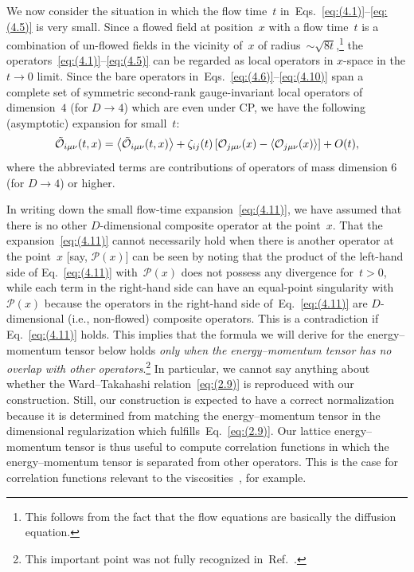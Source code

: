 We now consider the situation in which the flow time~$t$
in~Eqs.~\eqref{eq:(4.1)}--\eqref{eq:(4.5)} is very small. Since a flowed field
at position~$x$ with a flow time~$t$ is a combination of un-flowed fields in
the vicinity of~$x$ of radius~$\sim\sqrt{8t}$,\footnote{This follows from
the fact that the flow equations are basically the diffusion equation.} the
operators~\eqref{eq:(4.1)}--\eqref{eq:(4.5)} can be regarded as local operators
in $x$-space in the $t\to0$ limit. Since the bare operators
in~Eqs.~\eqref{eq:(4.6)}--\eqref{eq:(4.10)} span a complete set of symmetric
second-rank gauge-invariant local operators of dimension~$4$ (for $D\to4$)
which are even under CP, we have the following (asymptotic) expansion for
small~$t$:
\begin{equation}
   \Tilde{\mathcal{O}}_{i\mu\nu}(t,x)
   =\left\langle\Tilde{\mathcal{O}}_{i\mu\nu}(t,x)\right\rangle
   +\zeta_{ij}(t)
   \left[\mathcal{O}_{j\mu\nu}(x)
   -\left\langle\mathcal{O}_{j\mu\nu}(x)\right\rangle\right]+O(t),
\label{eq:(4.11)}
\end{equation}
where the abbreviated terms are contributions of operators of mass dimension
$6$ (for $D\to4$) or higher.

In writing down the small flow-time expansion~\eqref{eq:(4.11)}, we have
assumed that there is no other $D$-dimensional composite operator at the
point~$x$. That the expansion~\eqref{eq:(4.11)} cannot necessarily hold when
there is another operator at the point~$x$ [say, $\mathcal{P}(x)$] can be seen
by noting that the product of the left-hand side of Eq.~\eqref{eq:(4.11)}
with~$\mathcal{P}(x)$ does not possess any divergence for~$t>0$, while each
term in the right-hand side can have an equal-point singularity
with~$\mathcal{P}(x)$ because the operators in the right-hand side
of~Eq.~\eqref{eq:(4.11)} are $D$-dimensional (i.e., non-flowed) composite
operators. This is a contradiction if Eq.~\eqref{eq:(4.11)} holds. This implies
that the formula we will derive for the energy--momentum tensor below holds
\emph{only when the energy--momentum tensor has no overlap with other
operators}.\footnote{This important point was not fully recognized
in~Ref.~\cite{Suzuki:2013gza}.} In particular, we cannot say anything about
whether the Ward--Takahashi relation~\eqref{eq:(2.9)} is reproduced with our
construction. Still, our construction is expected to have a correct
normalization because it is determined from matching the energy--momentum
tensor in the dimensional regularization which fulfills~Eq.~\eqref{eq:(2.9)}.
Our lattice energy--momentum tensor is thus useful to compute correlation
functions in which the energy--momentum tensor is separated from other
operators. This is the case for correlation functions relevant to the
viscosities~\cite{Nakamura:2004sy,Meyer:2007ic,Meyer:2007dy}, for example.

